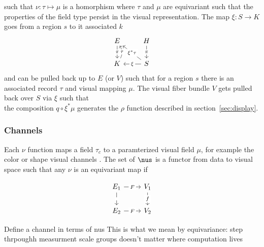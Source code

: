 \documentclass[../main.tex]{subfiles}
\begin{document}
such that $\nu: \tau \mapsto \mu$ is a homorphism where $\tau$ and $\mu$ are equivariant such that the properties of the field type persist in the visual representation. The map $\xi: S \rightarrow K$ goes from a region $s$ to it associated $k$ 
\begin{equation}
    \begin{tikzcd}
        E \arrow[d, "\pi" description]              & H \arrow[d, "\pi" description]                                    \\
        K \arrow[u, "\tau" description, bend right] & S \arrow[l, "\xi" description] \arrow[lu, "\xi^*\tau" description]
        \end{tikzcd}
\end{equation}
and can be pulled back up to $E$ (or $V$) such that for a region $s$ there is an associated record $\tau$ and visual mapping $\mu$. The visual fiber bundle $V$ gets pulled back over $S$ via $\xi$ such that 
\begin{equation}

\end{equation}
the composition $q \circ \xi^*\mu$ generates the $\rho$ function described in section~\ref{sec:display}. 



\subsubsection{Channels}
Each $\nu$ function maps a field $\tau_c$ to a paramterized visual field $\mu$, for example the color or shape visual channels \cite{bertinIIPropertiesGraphic2011,munznerMarksChannels}. The set of $\nus$ is a functor from data to visual space such that any $\nu$ is an equivariant map if 

\begin{equation}
    \begin{tikzcd}
        E_1 \arrow[r, "F" description] \arrow[d, "" description] & V_1 \arrow[d, "f" description] \\
        E_2 \arrow[r, "F" description]                            & V_2                           
    \end{tikzcd}
\end{equation}

Define a channel in terms of nus
This is what we mean by equivariance: 
step thrpoughh measurment scale groups
doesn't matter where computation lives
\end{document}
